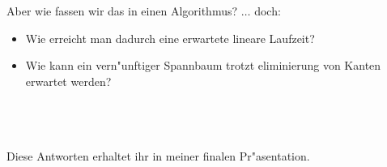 \documentclass[10pt]{beamer}
\newcommand{\gap}{\ \\ \ \\}
\begin{document}
\begin{frame}{Aber wie fassen wir das in einen Algorithmus?}
    $\ldots$ doch:\\
    \begin{itemize}
        \item Wie erreicht man dadurch eine erwartete lineare Laufzeit?
        \item Wie kann ein vern"unftiger Spannbaum trotzt eliminierung von Kanten
              erwartet werden?
    \end{itemize}\\
    \gap
    Diese Antworten erhaltet ihr in meiner finalen Pr"asentation.\\
\end{frame}
\end{document}
